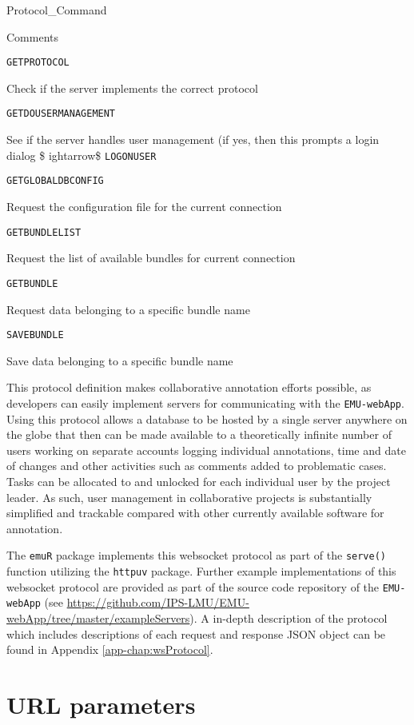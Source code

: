 \documentclass[
]{book}
\begin{document}
Protocol\_Command

Comments

\texttt{GETPROTOCOL}

Check if the server implements the correct protocol

\texttt{GETDOUSERMANAGEMENT}

See if the server handles user management (if yes, then this prompts a login dialog \$
ightarrow\$ \texttt{LOGONUSER}

\texttt{GETGLOBALDBCONFIG}

Request the configuration file for the current connection

\texttt{GETBUNDLELIST}

Request the list of available bundles for current connection

\texttt{GETBUNDLE}

Request data belonging to a specific bundle name

\texttt{SAVEBUNDLE}

Save data belonging to a specific bundle name

This protocol definition makes collaborative annotation efforts possible, as developers can easily implement servers for communicating with the \texttt{EMU-webApp}. Using this protocol allows a database to be hosted by a single server anywhere on the globe that then can be made available to a theoretically infinite number of users working on separate accounts logging individual annotations, time and date of changes and other activities such as comments added to problematic cases. Tasks can be allocated to and unlocked for each individual user by the project leader. As such, user management in collaborative projects is substantially simplified and trackable compared with other currently available software for annotation.

The \texttt{emuR} package implements this websocket protocol as part of the \texttt{serve()} function utilizing the \texttt{httpuv} package. Further example implementations of this websocket protocol are provided as part of the source code repository of the \texttt{EMU-webApp} (see \url{https://github.com/IPS-LMU/EMU-webApp/tree/master/exampleServers}). A in-depth description of the protocol which includes descriptions of each request and response JSON object can be found in Appendix \ref{app-chap:wsProtocol}.

\hypertarget{url-parameters}{%
\section{URL parameters}\label{url-parameters}}
\end{document}
